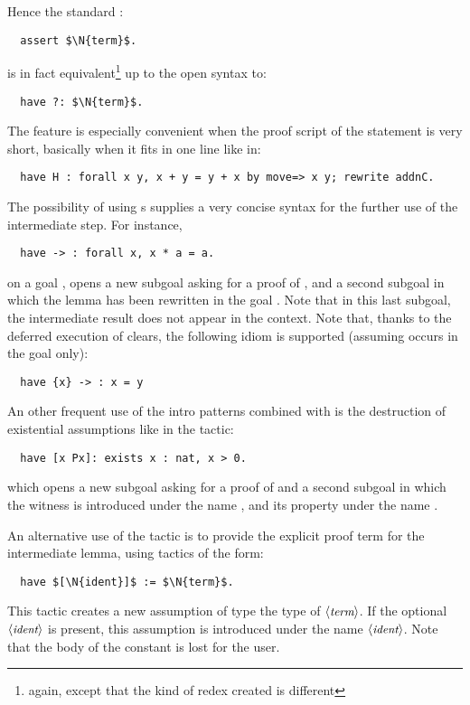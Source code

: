 Hence the standard \Coq{}:
\begin{lstlisting}
  assert $\N{term}$.
\end{lstlisting}
is in fact equivalent\footnote{again, except that the kind of redex
  created is different} up to the open syntax to:
\begin{lstlisting}
  have ?: $\N{term}$.
\end{lstlisting}

The  feature is especially convenient when the proof script of the
statement is very short, basically when it fits in one line like in:
\begin{lstlisting}
  have H : forall x y, x + y = y + x by move=> x y; rewrite addnC.
\end{lstlisting}

The possibility of using \iitem{}s supplies a very concise
syntax for the further use of the intermediate step. For instance,
\begin{lstlisting}
  have -> : forall x, x * a = a.
\end{lstlisting}
on a goal , opens a new subgoal asking for a proof of
, and a second subgoal in which the lemma
  has been rewritten in the goal . Note
 that in this last subgoal, the intermediate result does not appear in
 the context.
Note that, thanks to the deferred execution of clears, the following
idiom is supported (assuming  occurs in the goal only):
\begin{lstlisting}
  have {x} -> : x = y
\end{lstlisting}

An other frequent use of the intro patterns combined with  is the
destruction of existential assumptions like in the tactic:
\begin{lstlisting}
  have [x Px]: exists x : nat, x > 0.
\end{lstlisting}
which opens a new subgoal asking for a proof of  and  a second subgoal in which the witness is introduced under
the name , and its property under the name .

An alternative use of the  tactic is to provide the explicit proof
term for the intermediate lemma, using tactics of the form:
\begin{lstlisting}
  have $[\N{ident}]$ := $\N{term}$.
\end{lstlisting}
This tactic creates a new assumption of type the type of
$\langle\mbox{\itshape\rmfamily\small term}\rangle$. If the
optional $\langle\mbox{\itshape\rmfamily\small ident}\rangle$ is present, this assumption is introduced under
the name $\langle\mbox{\itshape\rmfamily\small ident}\rangle$. Note that the body of the constant is lost for
the user.

